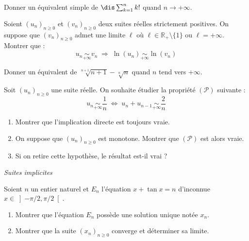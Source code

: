 \documentclass[a4paper,10pt]{report}
\begin{document}
\begin{Exa}[\ding{80}] Donner un équivalent simple de $\dis \sum_{k=1}^n k!$ quand $n \rightarrow + \infty$.
\end{Exa} 


\begin{Exa} Soient $(u_n)_{n \geq 0}$ et $(v_n)_{n \geq 0}$ deux suites réelles strictement positives. On suppose que $(v_n)_{n \geq 0}$ admet une limite $\ell$ où $\ell \in \mathbb{R}_+\setminus \lbrace 1 \rbrace$ ou $\ell= + \infty$. Montrer que :
$$ u_n \underset{+ \infty}{\sim} v_n \; \Longrightarrow  \; \ln(u_n) \underset{+ \infty}{\sim} \ln(v_n)$$
\end{Exa}


\begin{Exa}[\ding{80}] Donner un équivalent de $\sqrt[n+1]{n+1} - \sqrt[n]{n}$ quand $n$ tend vers $+ \infty$.
\end{Exa} 


\begin{Exa}[\ding{80}] Soit $(u_n)_{n \geq 0}$ une suite réelle. On souhaite étudier la propriété $(\mathcal{P})$ suivante :
$$ u_n \underset{+ \infty}{\sim} \dfrac{1}{n} \; \Longleftrightarrow \; u_n + u_{n-1} \underset{+ \infty}{\sim} \dfrac{2}{n}$$
\begin{enumerate}
\item Montrer que l'implication directe est toujours vraie.
\item On suppose que $(u_n)_{n \geq 0}$ est monotone. Montrer que $(\mathcal{P})$ est alors vraie.
\item Si on retire cette hypothèse, le résultat est-il vrai ?
\end{enumerate}
\end{Exa}


\medskip

\begin{center}
\textit{{ {\large Suites implicites}}}
\end{center}

\medskip

\begin{Exa} Soient $n$ un entier naturel et $E_n $ l'équation $x + \tan x = n$ d'inconnue $x \in \left] { - \pi  / 2,\pi  / 2} \right[$.

\begin{enumerate}
\item Montrer que l'équation $E_n$ possède une solution unique notée $x_n$.
\item Montrer que la suite $(x_n)_{n \geq 0}$ converge et déterminer sa limite.
\end{enumerate}
\end{Exa} 
\end{document}
